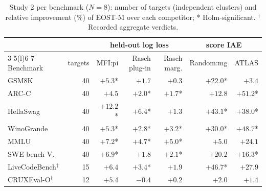 \begin{table}[tbp]
\centering\footnotesize
\caption{Study 2 per benchmark ($N=8$): number of targets (independent clusters) and relative improvement (\%) of EOST-M over each competitor; * Holm-significant. $^\dagger$Recorded aggregate verdicts.}
\label{tab:study2banks}
\setlength{\tabcolsep}{4pt}
\begin{tabular}{@{}lrrrrrr@{}}
\toprule
 & & \multicolumn{3}{c}{held-out log loss} & \multicolumn{2}{c}{score IAE} \\
\cmidrule(lr){3-5}\cmidrule(l){6-7}
Benchmark & targets & MFI:pi & Rasch plug-in & Rasch marg. & Random:mg & ATLAS \\
\midrule
GSM8K & 40 & $+5.3$* & $+1.7$ & $+0.3$ & $+22.0$* & $+3.4$ \\
ARC-C & 40 & $+4.5$ & $+2.0$* & $+1.7$* & $+12.8$ & $+51.2$* \\
HellaSwag & 40 & $+12.2$* & $+6.4$* & $+1.3$ & $+43.1$* & $+38.0$* \\
WinoGrande & 40 & $+5.3$* & $+2.8$* & $+3.2$* & $+30.0$* & $+48.7$* \\
MMLU & 40 & $+7.2$* & $+4.7$* & $+5.0$* & $+5.0$ & $+24.1$ \\
SWE-bench V. & 40 & $+6.9$* & $+1.8$ & $+2.1$* & $+20.2$ & $+16.3$* \\
LiveCodeBench$^\dagger$ & 15 & $+6.4$ & $+3.4$* & $+1.9$ & $+46.7$* & $+27.9$ \\
CRUXEval-O$^\dagger$ & 12 & $+5.4$ & $-0.4$ & $+0.2$ & $+2.0$ & $+1.4$ \\
\bottomrule
\end{tabular}
\end{table}
